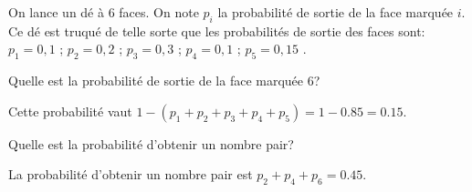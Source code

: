 \exoCorr{}

On lance un dé à 6 faces. On note $p_i$ la probabilité de sortie de la face marquée $i$. Ce dé est truqué de telle sorte que les probabilités de sortie des faces sont: $p_1 = 0,1$ ; $p_2 = 0,2$ ; $p_3 = 0,3$ ; $p_4 = 0,1$ ; $p_5 = 0,15$ .

\question{}
Quelle est la probabilité de sortie de la face marquée 6?

Cette probabilité vaut $1-(p_1 + p_2 + p_3 + p_4 + p_5) = 1-0.85 = 0.15$.

\question{}
Quelle est la probabilité d'obtenir un nombre pair?

La probabilité d'obtenir un nombre pair est $p_2 + p_4 + p_6 = 0.45$.

